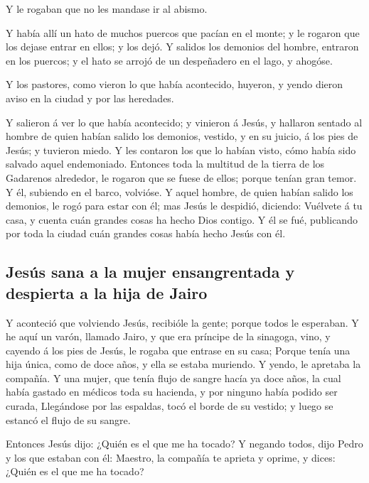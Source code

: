 Y le rogaban que no les mandase ir al abismo.

 Y había allí un hato de muchos puercos que pacían en el
monte; y le rogaron que los dejase entrar en ellos; y los dejó.
 Y salidos los demonios del hombre, entraron en los
puercos; y el hato se arrojó de un despeñadero en el lago, y ahogóse.

 Y los pastores, como vieron lo que había acontecido,
huyeron, y yendo dieron aviso en la ciudad y por las heredades.

 Y salieron á ver lo que había acontecido; y vinieron á
Jesús, y hallaron sentado al hombre de quien habían salido los demonios,
vestido, y en su juicio, á los pies de Jesús; y tuvieron miedo.
 Y les contaron los que lo habían visto, cómo había sido
salvado aquel endemoniado.  Entonces toda la multitud de la
tierra de los Gadarenos alrededor, le rogaron que se fuese de ellos;
porque tenían gran temor. Y él, subiendo en el barco, volvióse.
 Y aquel hombre, de quien habían salido los demonios, le
rogó para estar con él; mas Jesús le despidió, diciendo: 
Vuélvete á tu casa, y cuenta cuán grandes cosas ha hecho Dios contigo. Y
él se fué, publicando por toda la ciudad cuán grandes cosas había hecho
Jesús con él.

\hypertarget{jesuxfas-sana-a-la-mujer-ensangrentada-y-despierta-a-la-hija-de-jairo}{%
\subsection{Jesús sana a la mujer ensangrentada y despierta a la hija de
Jairo}\label{jesuxfas-sana-a-la-mujer-ensangrentada-y-despierta-a-la-hija-de-jairo}}

 Y aconteció que volviendo Jesús, recibióle la gente;
porque todos le esperaban.  Y he aquí un varón, llamado
Jairo, y que era príncipe de la sinagoga, vino, y cayendo á los pies de
Jesús, le rogaba que entrase en su casa;  Porque tenía una
hija única, como de doce años, y ella se estaba muriendo. Y yendo, le
apretaba la compañía.  Y una mujer, que tenía flujo de
sangre hacía ya doce años, la cual había gastado en médicos toda su
hacienda, y por ninguno había podido ser curada, 
Llegándose por las espaldas, tocó el borde de su vestido; y luego se
estancó el flujo de su sangre.

 Entonces Jesús dijo: ¿Quién es el que me ha tocado? Y
negando todos, dijo Pedro y los que estaban con él: Maestro, la compañía
te aprieta y oprime, y dices: ¿Quién es el que me ha tocado?

